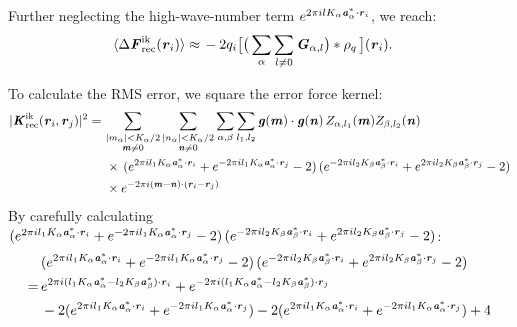 \documentclass[aps,pre,preprint]{revtex4}
\renewcommand{\v}[1]{\textbf{\textit{#1}}}
\begin{document}
Further neglecting the
high-wave-number term $e^{2\pi i l K_\alpha\v a^\ast_\alpha\cdot \v r_i}$, we reach:
\begin{align}
  \langle\Delta\v F^{\textrm{ik}}_{\textrm{rec}}(\v r_i)\rangle
  \approx\,&
  -2q_i
  \big[
  \big(
  \sum_{\alpha}\sum_{l\neq 0}\v G_{\alpha,l}
  \big)
  \ast\rho_q\,
  \big] (\v r_i).
\end{align}

To calculate the RMS error, we square the error force kernel:
\begin{align}\nonumber
  \vert\v K^{\textrm{ik}}_{\textrm{rec}}(\v r_i,\v r_j)\vert^2
  =\,&
  \sum_{
    \begin{subarray}{c}
      \vert m_{\alpha}\vert < K_\alpha/2\\
      \v m\neq 0
    \end{subarray}}
  \sum_{
    \begin{subarray}{c}
      \vert n_{\alpha}\vert < K_\alpha/2\\
      \v n\neq 0
    \end{subarray}}
  \sum_{\alpha,\beta}
  \sum_{l_1,l_2}
  \v g(\v m)\cdot\v g(\v n)\,
  Z_{\alpha,l_1}(\v m)Z_{\beta,l_2}(\v n)
  \\\nonumber
  &\,
  \times
  \,(
  e^{2\pi i l_1 K_\alpha\v a^\ast_\alpha\cdot \v r_i} +
  e^{-2\pi i l_1 K_\alpha\v a^\ast_\alpha\cdot \v r_j}
  - 2
  )
  \,(
  e^{-2\pi i l_2 K_\beta\v a^\ast_\beta\cdot \v r_i} +
  e^{2\pi i l_2 K_\beta\v a^\ast_\beta\cdot \v r_j}
  - 2
  )\\
  &\,
  \times
  e^{-2\pi i(\v m-\v n)\cdot(\v r_i-\v r_j)}
\end{align}
By  carefully calculating
$  (
e^{2\pi i l_1 K_\alpha\v a^\ast_\alpha\cdot \v r_i} +
e^{-2\pi i l_1 K_\alpha\v a^\ast_\alpha\cdot \v r_j}
- 2
)
\,(
e^{-2\pi i l_2 K_\beta\v a^\ast_\beta\cdot \v r_i} +
e^{2\pi i l_2 K_\beta\v a^\ast_\beta\cdot \v r_j}
- 2
)$:
\begin{align}\nonumber
  &(
  e^{2\pi i l_1 K_\alpha\v a^\ast_\alpha\cdot \v r_i} +
  e^{-2\pi i l_1 K_\alpha\v a^\ast_\alpha\cdot \v r_j}
  - 2
  )
  \,(
  e^{-2\pi i l_2 K_\beta\v a^\ast_\beta\cdot \v r_i} +
  e^{2\pi i l_2 K_\beta\v a^\ast_\beta\cdot \v r_j}
  - 2
  ) \\ \nonumber
  = \,&
  e^{2\pi i(l_1K_\alpha\v a^\ast_\alpha - l_2K_\beta\v a^\ast_\beta)\cdot\v r_i} +
  e^{-2\pi i(l_1K_\alpha\v a^\ast_\alpha - l_2K_\beta\v a^\ast_\beta)\cdot\v r_j} \\
  \label{eqn:ik.cal.tmp1}
  &-2(
  e^{2\pi i l_1 K_\alpha\v a^\ast_\alpha\cdot \v r_i} +
  e^{-2\pi i l_1 K_\alpha\v a^\ast_\alpha\cdot \v r_j}
  ) 
  -2(
  e^{2\pi i l_1 K_\alpha\v a^\ast_\alpha\cdot \v r_i} +
  e^{-2\pi i l_1 K_\alpha\v a^\ast_\alpha\cdot \v r_j}
  ) + 4
\end{align}
\end{document}
